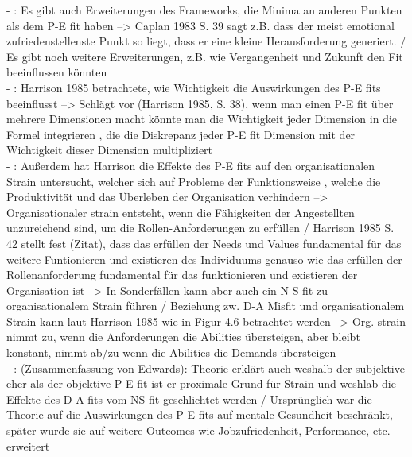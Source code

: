 - \cite[S. 23]{edwards:2008}: Es gibt auch Erweiterungen des Frameworks, die Minima an anderen Punkten als dem P-E fit haben --> Caplan 1983 S. 39 sagt z.B. dass der meist emotional zufriedenstellenste Punkt so liegt, dass er eine kleine Herausforderung generiert. / Es gibt noch weitere Erweiterungen, z.B. wie Vergangenheit und Zukunft den Fit beeinflussen könnten \\
- \cite[S. 23f.]{edwards:2008}: Harrison 1985 betrachtete, wie Wichtigkeit die Auswirkungen des P-E fits beeinflusst --> Schlägt vor (Harrison 1985, S. 38), wenn man einen P-E fit über mehrere Dimensionen macht könnte man die Wichtigkeit jeder Dimension in die Formel integrieren , die die Diskrepanz jeder P-E fit Dimension mit der Wichtigkeit dieser Dimension multipliziert \\
- \cite[S. 24]{edwards:2008}: Außerdem hat Harrison die Effekte des P-E fits auf den organisationalen Strain untersucht, welcher sich auf Probleme der Funktionsweise , welche die Produktivität und das Überleben der Organisation verhindern --> Organisationaler strain entsteht, wenn die Fähigkeiten der Angestellten unzureichend sind, um die Rollen-Anforderungen zu erfüllen / Harrison 1985 S. 42 stellt fest (Zitat), dass das erfüllen der Needs und Values fundamental für das weitere Funtionieren und existieren des Individuums genauso wie das erfüllen der Rollenanforderung fundamental für das funktionieren und existieren der Organisation ist --> In Sonderfällen kann aber auch ein N-S fit zu organisationalem Strain führen / Beziehung zw. D-A Misfit und organisationalem Strain kann laut Harrison 1985 wie in Figur 4.6 betrachtet werden --> Org. strain nimmt zu, wenn die Anforderungen die Abilities übersteigen, aber bleibt konstant, nimmt ab/zu wenn die Abilities die Demands übersteigen \\
- \cite[S. 24]{edwards:2008}: (Zusammenfassung von Edwards): Theorie erklärt auch weshalb der subjektive eher als der objektive P-E fit ist er proximale Grund für Strain und weshlab die Effekte des D-A fits vom NS fit geschlichtet werden / Ursprünglich war die Theorie auf die Auswirkungen des P-E fits auf mentale Gesundheit beschränkt, später wurde sie auf weitere Outcomes wie Jobzufriedenheit, Performance, etc. erweitert




